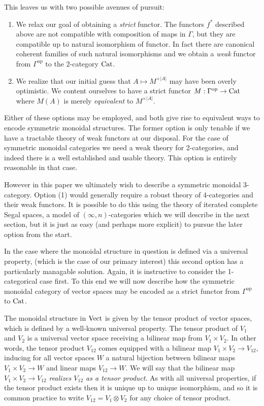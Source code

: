 \documentclass{amsart}
\begin{document}
This leaves us with two possible avenues of pursuit:
\begin{enumerate}
	\item We relax our goal of obtaining a {\em strict} functor. The functors $f^*$ described above are not compatible with composition of maps in $\Gamma$, but they are compatible up to natural isomorphism of functor. In fact there are canonical coherent families of such natural isomorphisms and we obtain a {\em weak} functor from $\Gamma^\text{op}$ to the 2-category $\mathrm{Cat}$. 
	\item We realize that our initial guess that $A \mapsto M^{\times |A|}$ may have been overly optimistic. We content ourselves to have a strict functor $M: \Gamma^\text{op} \to \mathrm{Cat}$ where $M(A)$ is merely {\em equivalent} to  $M^{\times |A|}$. 
\end{enumerate}
Either of these options may be employed, and both give rise to equivalent ways to encode symmetric monoidal structures. The former option is only tenable if we have a tractable theory of weak functors at our disposal. For the case of symmetric monoidal categories we need a weak theory for 2-categories, and indeed there is a well established and usable theory. This option is entirely reasonable in that case. 

However in this paper we ultimately wish to describe a symmetric monoidal 3-category. Option (1) would generally require a robust theory of 4-categories and their weak functors. It is possible to do this using the theory of iterated complete Segal spaces, a model of $(\infty, n)$-categories which we will describe in the next section, but it is just as easy (and perhaps more explicit) to pursue the later option from the start. 

In the case where the monoidal structure in question is defined via a universal property, (which is the case of our primary interest) this second option has a particularly managable solution. Again, it is instructive to consider the 1-categorical case first. To this end we will now describe how the symmetric monoidal category of vector spaces may be encoded as a strict functor from $\Gamma^\text{op}$ to $\mathrm{Cat}$. 

The monoidal structure in $\mathrm{Vect}$ is given by the tensor product of vector spaces, which is defined by a well-known universal property. The tensor product of $V_1$ and $ V_2$ is a universal vector space receiving a bilinear map from $V_1 \times V_2$. In other words, the tensor product $V_{12}$ comes equipped with a bilinear map  $V_1 \times V_2 \to V_{12}$, inducing for all vector spaces $W$ a natural bijection between bilinear maps $V_1 \times V_2 \to W$ and linear maps $V_{12} \to W$. We will say that the bilinear map  $V_1 \times V_2 \to V_{12}$ {\em realizes $V_{12}$ as a tensor product}. As with all universal properties, if the tensor product exists then it is unique up to unique isomorphism, and so it is common practice to write $V_{12} = V_1 \otimes V_2$ for any choice of tensor product.
\end{document}
